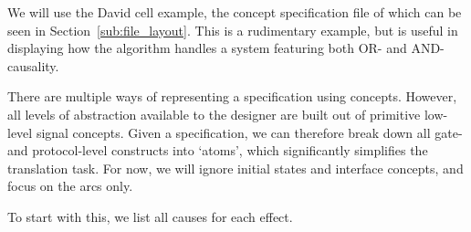 \documentclass[british,conference,compsoc]{IEEEtran}
\begin{document}
We will use the David cell example, the concept specification file of which can 
be seen in Section~\ref{sub:file_layout}. This is a rudimentary example, but is 
useful in displaying how the algorithm handles a system featuring both OR- and 
AND-causality.

There are multiple ways of representing a specification using concepts. However,
all levels of abstraction available to the designer are built out of primitive 
low-level signal concepts. Given a specification, we can therefore break down 
all gate- and protocol-level constructs into `atoms', which significantly 
simplifies the translation task. For now, we will ignore initial states and interface
concepts, and focus on the arcs only.

%
%
%

%

To start with this, we list all causes for each effect.
\end{document}
